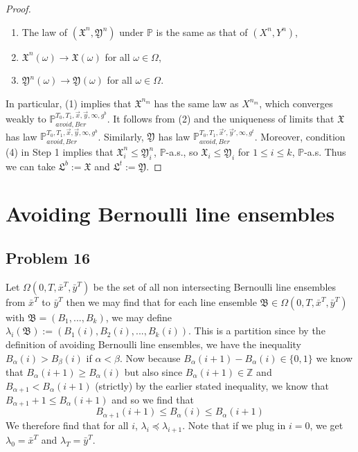 \documentclass[12pt]{article}
\begin{document}
\begin{proof}
\begin{enumerate}[label=(\arabic*)]
		\item The law of $(\mathfrak{X}^n,\mathfrak{Y}^n)$ under $\mathbb{P}$ is the same as that of $(X^n,Y^n)$,
		
		\item $\mathfrak{X}^n(\omega) \longrightarrow \mathfrak{X}(\omega)$ for all $\omega\in\Omega$,
		
		\item $\mathfrak{Y}^n(\omega) \longrightarrow \mathfrak{Y}(\omega)$ for all $\omega\in\Omega$.
		
	\end{enumerate}

	In particular, (1) implies that $\mathfrak{X}^{n_m}$ has the same law as $X^{n_m}$, which converges weakly to $\mathbb{P}_{avoid,Ber}^{T_0,T_1,\vec{x},\vec{y},\infty,g^b}$. It follows from (2) and the uniqueness of limits that $\mathfrak{X}$ has law $\mathbb{P}_{avoid,Ber}^{T_0,T_1,\vec{x},\vec{y},\infty,g^b}$. Similarly, $\mathfrak{Y}$ has law $\mathbb{P}_{avoid,Ber}^{T_0,T_1,\vec{x}',\vec{y}',\infty,g^t}$. Moreover, condition (4) in Step 1 implies that $\mathfrak{X}^n_i \leq \mathfrak{Y}^n_i$, $\mathbb{P}$-a.s., so $\mathfrak{X}_i \leq \mathfrak{Y}_i$ for $1\leq i\leq k$, $\mathbb{P}$-a.s. Thus we can take $\mathfrak{L}^b := \mathfrak{X}$ and $\mathfrak{L}^t := \mathfrak{Y}$.
	
	\end{proof}


\section{Avoiding Bernoulli line ensembles}

	\subsection*{Problem 16}
	Let $\Omega(0,T,\bar x^T, \bar y ^T)$ be the set of all non intersecting Bernoulli line ensembles from $\bar x^T$ to $\bar y^T$ then we may find that for each line ensemble $\mathfrak{B}\in \Omega(0,T,\bar x^T,\bar y^T)$ with $\mathfrak B=(B_1,...,B_k)$, we may define $\lambda_i(\mathfrak B):=(B_1(i),B_2(i),...,B_k(i))$. 
This is a partition since by the definition of avoiding Bernoulli line ensembles, we have the inequality $B_\alpha(i)>B_\beta(i)$ if $\alpha<\beta$. 
Now because $B_\alpha(i+1)-B_\alpha(i)\in \{0,1\}$ we know that $B_\alpha(i+1)\geq B_\alpha(i)$ but also since $B_\alpha(i+1)\in \mathbb{Z}$ and $B_{\alpha+1}<B_\alpha(i+1)$ (strictly) by the earlier stated inequality, we know that$B_{\alpha+1}+1\leq B_\alpha(i+1)$ and so we find that 
\[B_{\alpha+1}(i+1)\leq B_\alpha(i)\leq B_\alpha(i+1)\]
We therefore find that for all $i$, $\lambda_i\preceq \lambda_{i+1}$. Note that if we plug in $i=0$, we get $\lambda_0=\bar x^T$ and $\lambda_T=\bar y^T$.
\end{document}
